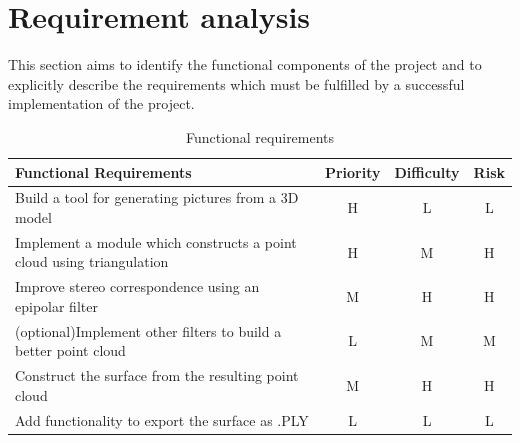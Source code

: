 \documentclass[12pt,a4paper,twoside,openright]{report}
\begin{document}
\section{}

\section{Requirement analysis}
This section aims to identify the functional components of the project and to  
explicitly describe the requirements which must be fulfilled by a successful implementation of the project.
\begin{samepage}
\begin{center}
\begin{table}
\begin{tabularx}{\textwidth}{@{} Y c c c @{}} %
\toprule
Functional Requirements & Priority & Difficulty & Risk\\
\midrule
Build a tool for generating pictures from a 3D model                    &   H       &     L      &   L \\ \addlinespace
Implement a module which constructs a point cloud using triangulation   &   H       &     M      &   H \\ \addlinespace
Improve stereo correspondence using an epipolar filter                  &   M       &     H      &   H \\ \addlinespace
(optional)Implement other filters to build a better point cloud         &   L       &     M      &   M \\ \addlinespace
Construct the surface from the resulting point cloud                    &   M       &     H      &   H \\ \addlinespace
Add functionality to export the surface as .PLY                         &   L       &     L      &   L \\ 
\bottomrule
\end{tabularx}
\caption{Functional requirements} 
\label{table:nonlin}
\end{table}
\end{center}

\noindent
\end{samepage}
\end{document}
